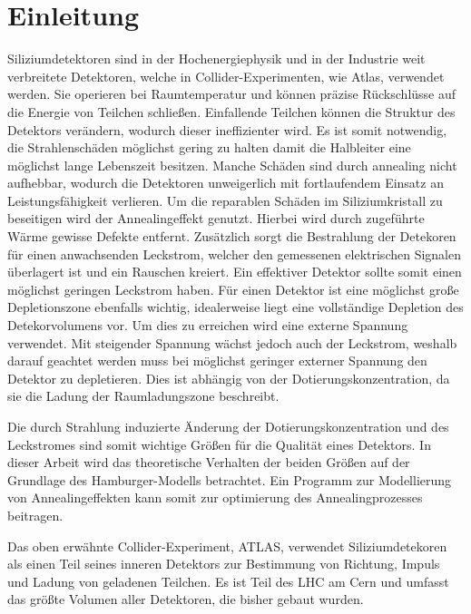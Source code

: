 \chapter{Einleitung}
Siliziumdetektoren sind in der Hochenergiephysik und in der Industrie weit verbreitete
Detektoren, welche in Collider-Experimenten, wie Atlas, verwendet werden.
Sie operieren bei Raumtemperatur und können präzise Rückschlüsse auf die
Energie von Teilchen schließen. Einfallende Teilchen können die
Struktur des Detektors verändern, wodurch dieser ineffizienter wird.
Es ist somit notwendig, die Strahlenschäden möglichst gering zu halten damit
die Halbleiter eine möglichst lange Lebenszeit besitzen. Manche Schäden sind durch annealing nicht
aufhebbar, wodurch die Detektoren unweigerlich mit fortlaufendem Einsatz
an Leistungsfähigkeit verlieren. Um die reparablen Schäden im Siliziumkristall
zu beseitigen wird der Annealingeffekt genutzt. Hierbei wird durch zugeführte Wärme gewisse
Defekte entfernt.
Zusätzlich sorgt die Bestrahlung der Detekoren für einen anwachsenden Leckstrom, welcher den
gemessenen elektrischen Signalen überlagert ist und ein Rauschen kreiert. Ein
effektiver Detektor sollte somit einen möglichst geringen Leckstrom haben.
Für einen Detektor ist eine möglichst große Depletionszone ebenfalls wichtig, idealerweise
liegt eine vollständige Depletion des Detekorvolumens vor. Um dies zu erreichen wird
eine externe Spannung verwendet. Mit steigender Spannung wächst jedoch auch der Leckstrom, weshalb
darauf geachtet werden muss bei möglichst geringer externer Spannung den Detektor zu depletieren.
Dies ist abhängig von der Dotierungskonzentration, da sie die Ladung der
Raumladungszone beschreibt.

Die durch Strahlung induzierte Änderung der Dotierungskonzentration und des Leckstromes sind
somit wichtige Größen für die Qualität eines Detektors. In dieser Arbeit wird das
theoretische Verhalten der beiden Größen auf der Grundlage des Hamburger-Modells betrachtet.
Ein Programm zur Modellierung von Annealingeffekten kann somit zur
optimierung des Annealingprozesses beitragen.


Das oben erwähnte Collider-Experiment, ATLAS, verwendet Siliziumdetekoren als
einen Teil seines inneren Detektors zur Bestimmung von Richtung, Impuls
und Ladung von geladenen Teilchen. Es ist Teil des LHC am Cern und umfasst
das größte Volumen aller Detektoren, die bisher gebaut wurden\cite{atlas}. 
